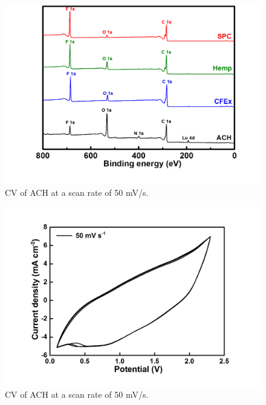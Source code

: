 \begin{figure}[tbh!]
  \centering
  \includegraphics[width=\textwidth]{SF/XPSoverall}
    \caption{CV of ACH at a scan rate of 50 mV/s.}
  \label{SF:XPSoverall}
\end{figure}
\begin{figure}[tbh!]
  \centering
  \includegraphics[width=\textwidth]{SF/hair50mVs}
    \caption{CV of ACH at a scan rate of 50 mV/s.}
  \label{SF:hair50mVs}
\end{figure}
